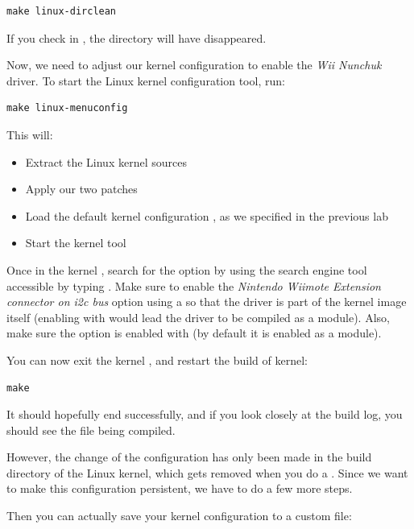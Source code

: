 \begin{verbatim}
make linux-dirclean
\end{verbatim}

If you check in , the  directory
will have disappeared.

Now, we need to adjust our kernel configuration to enable the {\em Wii
Nunchuk} driver. To start the Linux kernel configuration tool, run:

\begin{verbatim}
make linux-menuconfig
\end{verbatim}

This will:

\begin{itemize}
\item Extract the Linux kernel sources
\item Apply our two patches
\item Load the default kernel configuration
  , as we specified in the previous lab
\item Start the kernel  tool
\end{itemize}

Once in the kernel , search for the option
 by using the search engine tool
accessible by typing \code{/}. Make sure to enable the {\em Nintendo
  Wiimote Extension connector on i2c bus} option using a \code{*} so
that the driver is part of the kernel image itself (enabling with
 would lead the driver to be compiled as a module). Also, make
sure the  option is enabled with \code{*} (by
default it is enabled as a module).

You can now exit the kernel , and restart the build
of kernel:

\begin{verbatim}
make
\end{verbatim}

It should hopefully end successfully, and if you look closely at the
build log, you should see the file  being compiled.

However, the change of the configuration has only been made in the
build directory of the Linux kernel, which gets removed when you do a
. Since we want to make this configuration
persistent, we have to do a few more steps.

Then you can actually save your kernel configuration to a custom file:

